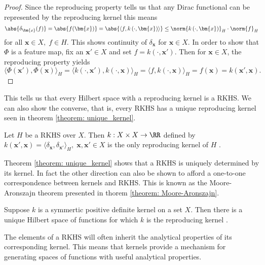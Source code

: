 \begin{proof}
    Since the reproducing property tells us that any Dirac functional can be represented by the reproducing kernel this means
    \[
        \abs{\delta_{\bm{x}} (f)} = \abs{f(\bm{x})} = \abs{\langle f , k \left( \cdot, \bm{x} \right) \rangle} \leq \norm{k \left( \cdot, \bm{x} \right)}_H \cdot \norm{f}_H
    \]
    for all $\bm{x} \in X, \; f \in H$. This shows continuity of $\delta_{\bm{x}}$ for $\bm{x} \in X$. In order to show that $\Phi$ is a feature map, fix an $\bm{x}' \in X$ and set $f = k \left( \cdot, \bm{x}' \right)$. Then for $\bm{x} \in X$, the reproducing property yields
    \[
        \langle \Phi (\bm{x}') , \Phi (\bm{x}) \rangle_H = \langle k \left( \cdot, \bm{x}' \right) , k \left( \cdot, \bm{x} \right) \rangle_H = \langle f , k \left( \cdot, \bm{x} \right) \rangle_H = f(\bm{x}) = k \left( \bm{x}', \bm{x} \right).
    \]
\end{proof}

This tells us that every Hilbert space with a reproducing kernel is a RKHS. We can also show the converse, that is, every RKHS has a unique reproducing kernel seen in theorem \ref{theorem: unique_kernel}.

\begin{thm} \label{theorem: unique_kernel}
    Let $H$ be a RKHS over $X$. Then $k: X \times X \to \RR$ defined by $k \left( \bm{x}', \bm{x} \right) = \langle \delta_{\bm{x}} , \delta_{\bm{x}'} \rangle_H, \; \bm{x} , \bm{x}' \in X$ is the only reproducing kernel of $H$ \cite{SteinwartIngo2008SVMb}.
\end{thm}

Theorem \ref{theorem: unique_kernel} shows that a RKHS is uniquely determined by its kernel. In fact the other direction can also be shown to afford a one-to-one correspondence between kernels and RKHS. This is known as the Moore-Aronszajn theorem presented in thorem \ref{theorem: Moore-Aronszajn}.

\begin{thm} \label{theorem: Moore-Aronszajn}
    Suppose $k$ is a symmertic positive definite kernel on a set $X$. Then there is a unique Hilbert space of functions for which $k$ is the reproducing kernel \cite{BerlinetAlain2003RKHS}.
\end{thm}

The elements of a RKHS will often inherit the analytical properties of its corresponding kernel. This means that kernels provide a mechanism for generating spaces of functions with useful analytical properties.